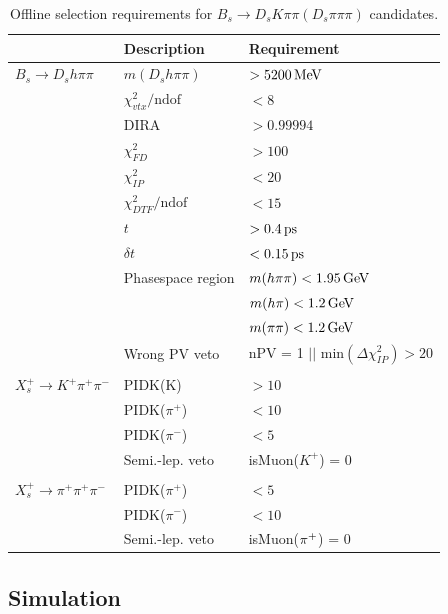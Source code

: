 \begin{table}[h]
\centering
\caption{Offline selection requirements for $B_s\to D_s K \pi\pi (D_s \pi\pi\pi)$ candidates.}
 \renewcommand{\arraystretch}{1.}
 \small
 \begin{tabular}{l l l}
\hline
\hline
 & Description & Requirement  \\
\hline
$B_s \to D_s h \pi \pi$  & $m(D_s h \pi \pi)$ & $> 5200 \mathrm{\,Me\kern -0.1em V}$ \\
&  $\chi^{2}_{vtx}/\text{ndof}  $&$ <  8$ \\
& DIRA &$ > 0.99994$ \\
& $\chi^{2}_{FD}$ & $> 100$ \\
& $\chi^{2}_{IP}$ & $< 20$ \\
&  $\chi^{2}_{DTF}/\text{ndof} $&$   <  15 $ \\
& $t$  & $ > 0.4 {\mathrm{ \,ps}}$ \\
& $\delta t$  & $ < 0.15 {\mathrm{ \,ps}}$ \\
& Phasespace region & $m(h\pi\pi) < 1.95 \mathrm{\,Ge\kern -0.1em V}$ \\ & & $m(h\pi) < 1.2 \mathrm{\,Ge\kern -0.1em V}$ \\ & & $m(\pi\pi) < 1.2 \mathrm{\,Ge\kern -0.1em V}$ \\
& Wrong PV veto & nPV = 1 $||$  $\text{min}(\Delta\chi^{2}_{IP}) > 20$ \\
\\
$X_s^+ \to K^+ \pi^+ \pi^-$  & PIDK(K) & $> 10$ \\
& PIDK($\pi^+$) & $< 10$ \\
& PIDK($\pi^-$) & $< 5$ \\
& Semi.-lep. veto & isMuon($K^+$) = 0 \\
\\
$X_s^+ \to \pi^+ \pi^+ \pi^-$  & PIDK($\pi^+$) & $< 5$ \\
& PIDK($\pi^-$) & $< 10$ \\
& Semi.-lep. veto & isMuon(${{\pi}^+}$) = 0 \\

\hline
\hline
\end{tabular}
\label{table:selBs}
\end{table}


\subsection{Simulation}




